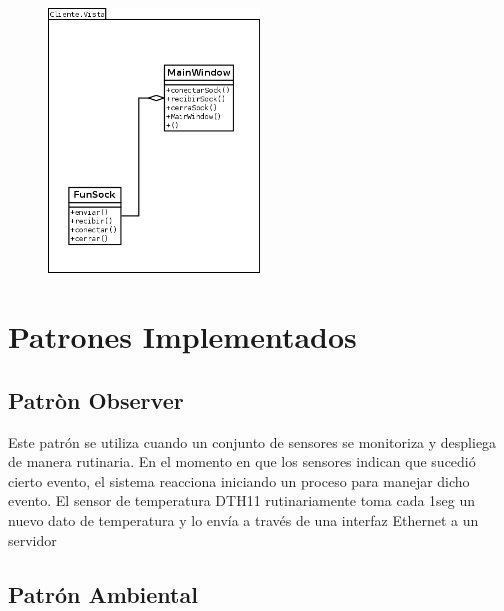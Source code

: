 \begin{figure}[h!]
 \begin{center}
  \includegraphics[width=0.5\textwidth,keepaspectratio=true]{img/Clases_Vista.png}
  \label{fig:esquema}
 \end{center}
\end{figure}



\section{\textcolor[gray]{.2}{Patrones Implementados}}
\subsection{\textcolor[gray]{.2}{Patròn Observer }}

Este patrón se utiliza cuando un conjunto de sensores se monitoriza y despliega de manera rutinaria. En el momento en que los sensores indican que sucedió cierto evento, el sistema reacciona iniciando un proceso para manejar dicho evento.
El sensor de temperatura DTH11 rutinariamente toma cada 1seg un nuevo dato de temperatura  y lo envía a través de una interfaz Ethernet a un servidor

\subsection{\textcolor[gray]{.2}{Patrón Ambiental}}

